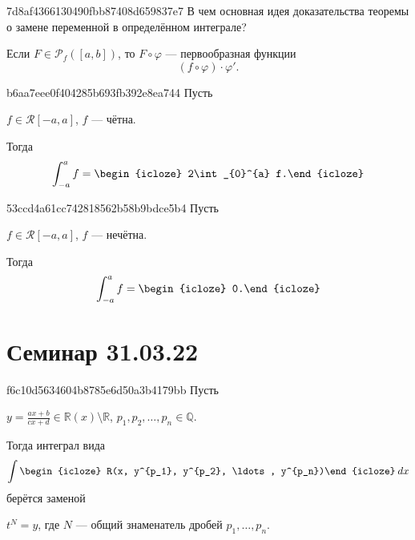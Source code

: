 \begin{note}{7d8af4366130490fbb87408d659837e7}
    В чем основная идея доказательства теоремы о замене переменной в определённом интеграле?

    \begin{cloze}{1}
        Если \({ F \in \mathscr P_f ([a, b]) }\), то \({ F \circ \varphi }\) --- первообразная функции
        \[
            (f \circ \varphi) \cdot \varphi'.
        \]
    \end{cloze}
\end{note}

\begin{note}{b6aa7eee0f404285b693fb392e8ea744}
    Пусть \begin{icloze}{2}\({ f \in \mathcal R[-a, a] }\), \({ f }\) --- чётна.\end{icloze}
    Тогда
    \[
        \begin{gathered}
            \int_{-a}^{a} f = \begin{icloze}{1}2\int_{0}^{a} f.\end{icloze}
        \end{gathered}
    \]
\end{note}

\begin{note}{53ccd4a61cc742818562b58b9bdce5b4}
    Пусть \begin{icloze}{2}\({ f \in \mathcal R[-a, a] }\), \({ f }\) --- нечётна.\end{icloze}
    Тогда
    \[
        \begin{gathered}
            \int_{-a}^{a} f = \begin{icloze}{1}0.\end{icloze}
        \end{gathered}
    \]
\end{note}

\section{Семинар 31.03.22}
\begin{note}{f6c10d5634604b8785e6d50a3b4179bb}
    Пусть \begin{icloze}{3}\({ y = \frac{ax + b}{cx + d} \in \mathbb R(x) \setminus \mathbb R }\),\: \({ p_1, p_2, \ldots, p_n \in \mathbb Q }\).\end{icloze}
    Тогда интеграл вида
    \[
        \int \begin{icloze}{2}R(x, y^{p_1}, y^{p_2}, \ldots, y^{p_n})\end{icloze}\: dx
    \]
    берётся заменой \begin{icloze}{1}\({ t^{N} = y }\), где \({ N }\) --- общий знаменатель дробей \({ p_1, \ldots, p_n }\).\end{icloze}
\end{note}

